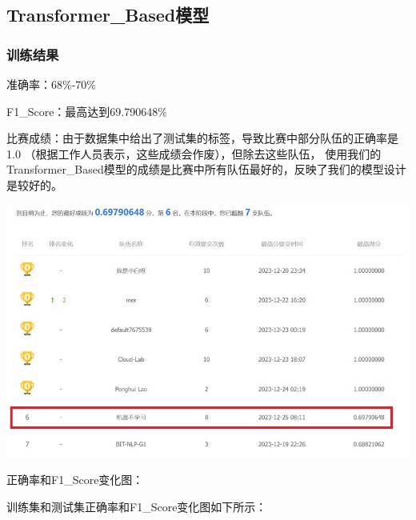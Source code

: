 \documentclass[11pt]{article}
\begin{document}
        \subsection{Transformer\_Based模型}
            \subsubsection{训练结果}
            准确率：68\%-70\%

            F1\_Score：最高达到69.790648\%
            
            比赛成绩：由于数据集中给出了测试集的标签，导致比赛中部分队伍的正确率是1.0
            （根据工作人员表示，这些成绩会作废），但除去这些队伍，
            使用我们的Transformer\_Based模型的成绩是比赛中所有队伍最好的，反映了我们的模型设计是较好的。

            \begin{center}
                \includegraphics[scale=1]{graph/result5.jpg}
            \end{center}

            正确率和F1\_Score变化图：

            训练集和测试集正确率和F1\_Score变化图如下所示：
\end{document}

